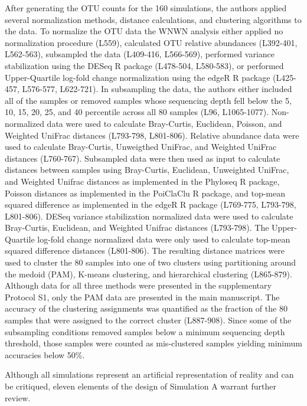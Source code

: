\documentclass[
]{article}
\begin{document}
After generating the OTU counts for the 160 simulations, the authors
applied several normalization methods, distance calculations, and
clustering algorithms to the data. To normalize the OTU data the WNWN
analysis either applied no normalization procedure (L559), calculated
OTU relative abundances (L392-401, L562-563), subsampled the data
(L409-416, L566-569), performed variance stabilization using the DESeq R
package (L478-504, L580-583), or performed Upper-Quartile log-fold
change normalization using the edgeR R package (L425-457, L576-577,
L622-721). In subsampling the data, the authors either included all of
the samples or removed samples whose sequencing depth fell below the 5,
10, 15, 20, 25, and 40 percentile across all 80 samples (L96,
L1065-1077). Non-normalized data were used to calculate Bray-Curtis,
Euclidean, Poisson, and Weighted UniFrac distances (L793-798, L801-806).
Relative abundance data were used to calculate Bray-Curtis, Unweigthed
UniFrac, and Weighted UniFrac distances (L760-767). Subsampled data were
then used as input to calculate distances between samples using
Bray-Curtis, Euclidean, Unweighted UniFrac, and Weighted Unifrac
distances as implemented in the Phyloseq R package, Poisson distances as
implemented in the PoiClaClu R package, and top-mean squared difference
as implemented in the edgeR R package (L769-775, L793-798, L801-806).
DESeq variance stabilization normalized data were used to calculate
Bray-Curtis, Euclidean, and Weighted Unifrac distances (L793-798). The
Upper-Quartile log-fold change normalized data were only used to
calculate top-mean squared difference distances (L801-806). The
resulting distance matrices were used to cluster the 80 samples into one
of two clusters using partitioning around the medoid (PAM), K-means
clustering, and hierarchical clustering (L865-879). Although data for
all three methods were presented in the supplementary Protocol S1, only
the PAM data are presented in the main manuscript. The accuracy of the
clustering assignments was quantified as the fraction of the 80 samples
that were assigned to the correct cluster (L887-908). Since some of the
subsampling conditions removed samples below a minimum sequencing depth
threshold, those samples were counted as mis-clustered samples yielding
minimum accuracies below 50\%.

Although all simulations represent an artificial representation of
reality and can be critiqued, eleven elements of the design of
Simulation A warrant further review.
\end{document}
